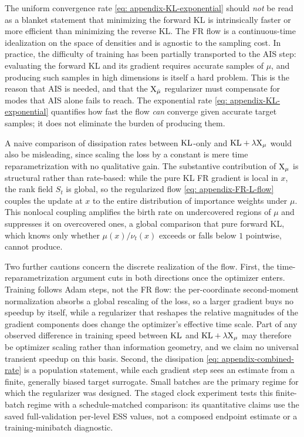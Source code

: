 \documentclass{article}
\begin{document}
The uniform convergence rate \eqref{eq: appendix-KL-exponential} should \emph{not} be read as a blanket statement that minimizing the forward KL is intrinsically faster or more efficient than minimizing the reverse KL. The FR flow is a continuous-time idealization on the space of densities and is agnostic to the sampling cost. In practice, the difficulty of training has been partially transported to the AIS step: evaluating the forward KL and its gradient requires accurate samples of $\mu$, and producing such samples in high dimensions is itself a hard problem. This is the reason that AIS is needed, and that the $\mathrm{X}_{\hat\mu}$ regularizer must compensate for modes that AIS alone fails to reach. The exponential rate \eqref{eq: appendix-KL-exponential} quantifies how fast the flow \emph{can} converge given accurate target samples; it does not eliminate the burden of producing them.

A naive comparison of dissipation rates between $\mathrm{KL}$-only and $\mathrm{KL} + \lambda \mathrm{X}_\mu$ would also be misleading, since scaling the loss by a constant is mere time reparametrization with no qualitative gain. The substantive contribution of $\mathrm{X}_\mu$ is structural rather than rate-based: while the pure KL FR gradient is local in $x$, the rank field $S_t$ is global, so the regularized flow \eqref{eq: appendix-FR-L-flow} couples the update at $x$ to the entire distribution of importance weights under $\mu$. This nonlocal coupling amplifies the birth rate on undercovered regions of $\mu$ and suppresses it on overcovered ones, a global comparison that pure forward KL, which knows only whether $\mu(x)/\nu_t(x)$ exceeds or falls below $1$ pointwise, cannot produce.

Two further cautions concern the discrete realization of the flow. First, the time-reparametrization argument cuts in both directions once the optimizer enters. Training follows Adam steps, not the FR flow: the per-coordinate second-moment normalization absorbs a global rescaling of the loss, so a larger gradient buys no speedup by itself, while a regularizer that reshapes the relative magnitudes of the gradient components does change the optimizer's effective time scale. Part of any observed difference in training speed between $\mathrm{KL}$ and $\mathrm{KL} + \lambda \mathrm{X}_\mu$ may therefore be optimizer scaling rather than information geometry, and we claim no universal transient speedup on this basis. Second, the dissipation \eqref{eq: appendix-combined-rate} is a population statement, while each gradient step sees an estimate from a finite, generally biased target surrogate. Small batches are the primary regime for which the regularizer was designed. The staged clock experiment tests this finite-batch regime with a schedule-matched comparison: its quantitative claims use the saved full-validation per-level ESS values, not a composed endpoint estimate or a training-minibatch diagnostic.
\end{document}
